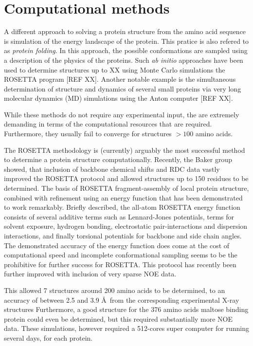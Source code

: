 \section{Computational methods}
A different approach to solving a protein structure from the amino acid sequence is simulation of the energy landscape of the protein.
This pratice is also refered to as \textit{protein folding}.
In this approach, the possible conformations are sampled using a description of the physics of the proteins.
Such \textit{ab initio} approaches have been used to determine structures up to XX using Monte Carlo simulations the ROSETTA program [REF XX].
Another notable example is the simultaneous determination of structure and dynamics of several small proteins via very long molecular dynamics (MD) simulations using the Anton computer [REF XX].

While these methods do not require any experimental input, the are extremely demanding in terms of the computational resources that are required.
Furthermore, they usually fail to converge for structures $>100$ amino acids.

The ROSETTA methodology is (currently) arguably the most successful method to determine a protein structure computationally.
Recently, the Baker group showed, that inclusion of backbone chemical shifts and RDC data vastly improved the ROSETTA protocol and allowed structures up to 150 residues to be determined.
The basis of ROSETTA fragment-assembly of local protein structure, combined with  refinement using an energy function that has been demonstrated to work remarkably.
Briefly described, the all-atom ROSETTA energy function consists of several additive terms such as Lennard-Jones potentials, terms for solvent exposure, hydrogen bonding, electrostatic pair-interactions and dispersion interactions, and finally torsional potentials for backbone and side chain angles.
The demonstrated accuracy of the energy function does come at the cost of computational speed and incomplete conformational sampling seems to be the prohibitive for further success for ROSETTA.
This protocol has recently been further improved with inclusion of very sparse NOE data.

This allowed 7 structures around 200 amino acids to be determined, to an accuracy of between 2.5 and 3.9 \AA~from the corresponding experimental X-ray structures
Furthermore, a good structure for the 376 amino acids maltose binding protein could even be determined, but this required substantially more NOE data.
These simulations, however required a 512-cores super computer for running several days, for each protein.

